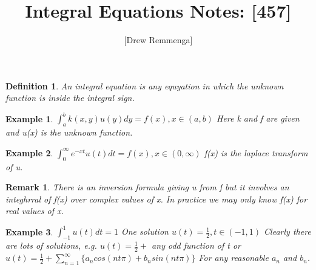 \documentclass[10pt, oneside]{article}
\title{Integral Equations Notes: [457]}
\author{[Drew Remmenga]}
\newtheorem{defn}{Definition}
\newtheorem{rem}{Remark}
\newtheorem{example}{Example}
\begin{document}
\maketitle

\vspace{.25in}

\begin{defn}
    An integral equation is any equyation in which the unknown function is inside the integral sign.
\end{defn}
\begin{example}
    $\int_{a}^{b} k(x,y)u(y)dy = f(x), x \in (a,b)$
    Here k and f are given and u(x) is the unknown function.
\end{example}
\begin{example}
    $\int_{0}^{\infty} e ^{-xt}u(t)dt = f(x), x \in (0,\infty)$
    f(x) is the laplace transform of u.
\end{example}
\begin{rem}
    There is an inversion formula giving u from f but it involves an integhrral of f(x) over complex values of x. In practice we may only know f(x) for real values of x.
\end{rem}
\begin{example}
    $\int_{-1}^{1} u(t) dt = 1$ One solution $u(t) = \frac{1}{2}, t \in (-1,1)$
    Clearly there are lots of solutions, e.g. 
    $u(t) = \frac{1}{2} +$ any odd function of t 
    or
    $u(t) = \frac{1}{2} + \sum_{n=1}^{\infty} \{ a_{n} cos(nt\pi)+b_{n} sin(nt\pi)\}$ For any reasonable $a_{n}$ and $b_{n}$.
\end{example}
\end{document}
